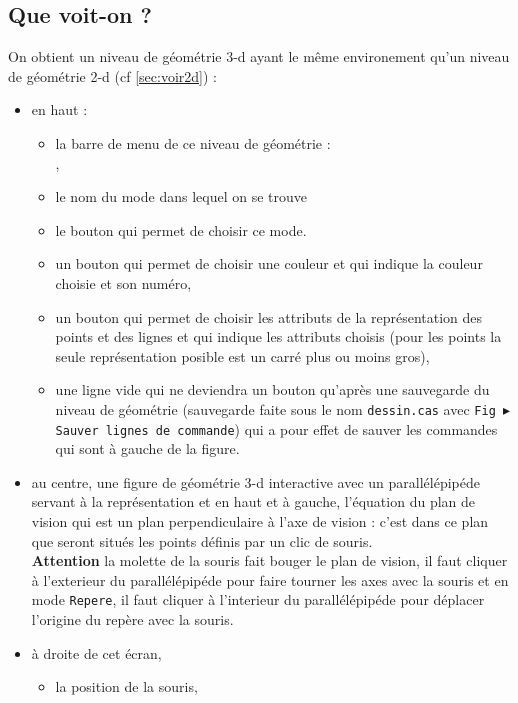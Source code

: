 \documentclass[a4paper,11pt]{article}
\begin{document}
\subsection{Que voit-on ?}
On obtient un niveau de g\'eom\'etrie 3-d ayant le m\^eme environement qu'un 
niveau de g\'eom\'etrie 2-d (cf \ref{sec:voir2d}) :
\begin{itemize}
\item en haut :
\begin{itemize}
\item la barre de menu de ce niveau de g\'eom\'etrie :\\
,
\item le nom du mode dans lequel on se trouve
\item le bouton  qui permet de choisir ce mode.
\item un bouton qui permet de choisir une couleur et qui indique la couleur 
choisie et son num\'ero, 
\item un bouton qui permet de choisir les attributs de la repr\'esentation 
des points et des lignes et qui indique les attributs choisis (pour les points 
la seule repr\'esentation posible est un carr\'e plus ou moins gros),
\item une ligne vide qui ne deviendra un bouton  
qu'apr\`es une sauvegarde du niveau de g\'eom\'etrie (sauvegarde faite sous 
le nom {\tt dessin.cas} avec 
{\tt Fig $\blacktriangleright$Sauver lignes de commande}) qui a pour effet 
de sauver les commandes qui sont \`a gauche de la figure.
\end{itemize}
\item au centre, une figure de g\'eom\'etrie 3-d interactive avec un
parall\'el\'epip\'ede servant \`a la repr\'esentation et en haut et \`a 
gauche, l'\'equation du plan de vision qui est un plan perpendiculaire \`a 
l'axe de vision : c'est dans ce plan que seront situ\'es les points d\'efinis 
par un clic de souris.\\
{\bf Attention} la molette de la souris fait bouger le 
plan de vision, il faut cliquer \`a l'exterieur du parall\'el\'epip\'ede pour 
faire tourner les axes avec la  souris et en  mode {\tt Repere}, il faut 
cliquer \`a l'interieur du parall\'el\'epip\'ede pour d\'eplacer l'origine du 
rep\`ere avec la souris.
\item \`a droite de cet \'ecran, 
\begin{itemize}
\item la position de la souris,

\end{itemize}
\end{itemize}
\end{document}
